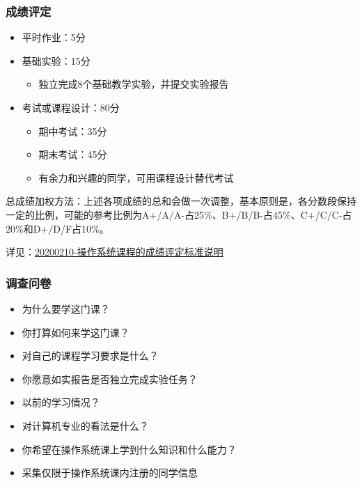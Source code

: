 \documentclass[UTF8]{ctexbeamer}
\begin{document}
\begin{frame}[fragile]
    \frametitle{成绩评定}
    \begin{itemize}
        \item 平时作业：5分
        \item 基础实验：15分
        \begin{itemize}
            \item 独立完成8个基础教学实验，并提交实验报告
        \end{itemize}
        \item 考试或课程设计：80分
        \begin{itemize}
            \item 期中考试：35分
            \item 期末考试：45分
            \item 有余力和兴趣的同学，可用课程设计替代考试
        \end{itemize}

    \end{itemize}

    总成绩加权方法：上述各项成绩的总和会做一次调整，基本原则是，各分数段保持一定的比例，可能的参考比例为A+/A/A-占25\%、B+/B/B-占45\%、C+/C/C-占20\%和D+/D/F占10\%。 
    \newline \newline 
    
    详见：\href{http://os.cs.tsinghua.edu.cn/oscourse/OS2020spring/log#A20200210-.2BZM1PXHz7ft.2BL.2FnoLdoRiEH7pi8RbmmgHUcaL9GYO-}{20200210-操作系统课程的成绩评定标准说明}
    
\end{frame}

    
    \begin{frame}
        \frametitle{调查问卷}
        \begin{itemize}
            \item 为什么要学这门课？
            \item 你打算如何来学这门课？
            \item 对自己的课程学习要求是什么？
            \item 你愿意如实报告是否独立完成实验任务？
            \item 以前的学习情况？
            \item 对计算机专业的看法是什么？
            \item 你希望在操作系统课上学到什么知识和什么能力？
            \item 采集仅限于操作系统课内注册的同学信息
        \end{itemize}
    \end{frame}
\end{document}
